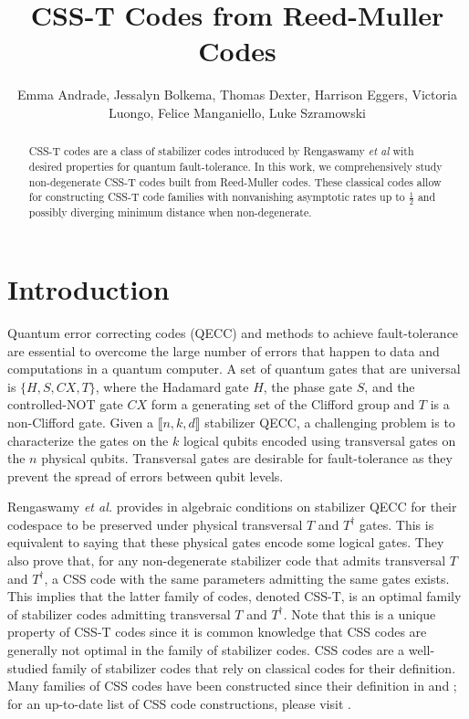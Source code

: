 \documentclass{amsart}
\title{CSS-T Codes from Reed-Muller Codes}
\author[]{Emma Andrade, Jessalyn Bolkema, Thomas Dexter, Harrison Eggers, Victoria Luongo, Felice Manganiello, Luke Szramowski}
\date{}
\theoremstyle{definition}
\begin{document}
\maketitle

\begin{abstract}
    CSS-T codes are a class of stabilizer codes introduced by Rengaswamy \emph{et al} with desired properties for quantum fault-tolerance. In this work, we comprehensively study non-degenerate CSS-T codes built from Reed-Muller codes. These classical codes allow for constructing CSS-T code families with nonvanishing asymptotic rates up to $\frac{1}2$ and possibly diverging minimum distance when non-degenerate. 
\end{abstract}

\section{Introduction}

Quantum error correcting codes (QECC) and methods to achieve fault-tolerance are essential to overcome the large number of errors that happen to data and computations in a quantum computer. A set of quantum gates that are universal is $\{H,S,CX,T\}$, where the Hadamard gate $H$, the phase gate $S$, and the controlled-NOT gate $CX$ form a generating set of the Clifford group and $T$ is a non-Clifford gate. Given a $\llbracket n,k,d \rrbracket$ stabilizer QECC, a challenging problem is to characterize the gates on the $k$ logical qubits encoded using transversal gates on the $n$ physical qubits. Transversal gates are desirable for fault-tolerance as they prevent the spread of errors between qubit levels. 



Rengaswamy \emph{et al.} provides in \cite{CSS-T-it,CSS-T-isit}   algebraic conditions on stabilizer QECC for their codespace to be preserved under physical transversal $T$ and $T^\dagger$ gates. This is equivalent to saying that these physical gates encode some logical gates.  
 They also prove that, for any non-degenerate stabilizer code that admits transversal $T$ and $T^\dagger$, a CSS code with the same parameters admitting the same gates exists. This implies that the latter family of codes, denoted CSS-T, is an optimal family of stabilizer codes admitting transversal $T$ and $T^\dagger$. Note that this is a unique property of CSS-T codes since it is common knowledge that CSS codes are generally not optimal in the family of stabilizer codes. CSS codes are a well-studied family of stabilizer codes that rely on classical codes for their definition. Many families of CSS codes have been constructed since their definition in  \cite{CSofCSS} and \cite{SofCSS}; for an up-to-date list of CSS code constructions, please visit  \cite{eczoo_css}.  
\end{document}
